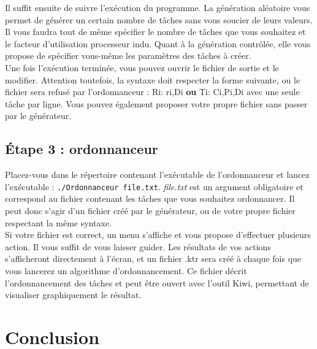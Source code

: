 		Il suffit ensuite de suivre l'exécution du programme. La génération aléatoire vous permet de générer un certain nombre de tâches sans vous soucier de leurs valeurs. Il vous faudra tout de même spécifier le nombre de tâches que vous souhaitez et le facteur d'utilisation processeur indu. Quant à la génération contrôlée, elle vous propose de spécifier vous-même les paramètres des tâches à créer.\\
		
		Une fois l'exécution terminée, vous pouvez ouvrir le fichier de sortie et le modifier. Attention toutefois, la syntaxe doit respecter la forme suivante, ou le fichier sera refusé par l'ordonnanceur : Ri: ri,Di \textbf{ou} Ti: Ci,Pi,Di avec une seule tâche par ligne. Vous pouvez également proposer votre propre fichier sans passer par le générateur.
		
		
	\section*{Étape 3 : ordonnanceur}
	
		Placez-vous dans le répertoire contenant l'exécutable de l'ordonnanceur et lancez l'exécutable : \verb+./Ordonnanceur file.txt+. \emph{file.txt} est un argument obligatoire et correspond au fichier contenant les tâches que vous souhaitez ordonnancer. Il peut donc s'agir d'un fichier créé par le générateur, ou de votre propre fichier respectant la même syntaxe.\\
		
		Si votre fichier est correct, un menu s'affiche et vous propose d'effectuer plusieurs action. Il vous suffit de vous laisser guider. Les résultats de vos actions s'afficheront directement à l'écran, et un fichier .ktr sera créé à chaque fois que vous lancerez un algorithme d'ordonnancement. Ce fichier décrit l'ordonnancement des tâches et peut être ouvert avec l'outil Kiwi, permettant de visualiser graphiquement le résultat.
	

\chapter{Conclusion}
